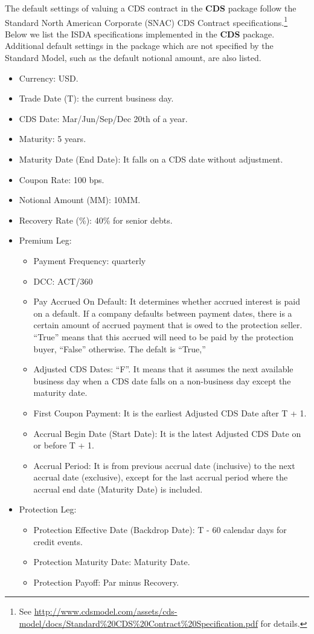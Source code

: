 \documentclass[a4paper]{article}
\begin{document}
The default settings of valuing a CDS contract in the \textbf{CDS}
package follow the Standard North American Corporate (SNAC) CDS
Contract specifications.\footnote{See
  \url{http://www.cdsmodel.com/assets/cds-model/docs/Standard\%20CDS\%20Contract\%20Specification.pdf}
  for details.} Below we list the ISDA specifications implemented in
the \textbf{CDS} package. Additional default settings in the package
which are not specified by the Standard Model, such as the default
notional amount, are also listed.


\begin{itemize}
\item Currency: USD.
\item Trade Date (T): the current business day.
\item CDS Date: Mar/Jun/Sep/Dec 20th of a year.
\item Maturity: 5 years.
\item Maturity Date (End Date): It falls on a CDS date without
  adjustment.
\item Coupon Rate: 100 bps.
\item Notional Amount (MM): 10MM.
\item Recovery Rate (\%): 40\% for senior debts.
\item Premium Leg:
  \begin{itemize}
    \item Payment Frequency: quarterly
    \item DCC: ACT/360
    \item Pay Accrued On Default: It determines whether accrued
      interest is paid on a default. If a company defaults between
      payment dates, there is a certain amount of accrued payment that
      is owed to the protection seller. ``True'' means that this
      accrued will need to be paid by the protection buyer, ``False''
      otherwise. The defalt is ``True,''
    \item Adjusted CDS Dates: ``F''. It means that it assumes the next
      available business day when a CDS date falls on a non-business day
      except the maturity date.
    \item First Coupon Payment: It is the earliest Adjusted CDS Date
      after T + 1.
    \item Accrual Begin Date (Start Date): It is the latest Adjusted
      CDS Date on or before T + 1.
    \item Accrual Period: It is from previous accrual date (inclusive)
      to the next accrual date (exclusive), except for the last
      accrual period where the accrual end date (Maturity Date) is
      included.
  \end{itemize}
\item Protection Leg:
  \begin{itemize}
  \item Protection Effective Date (Backdrop Date): T - 60 calendar
    days for credit events.
  \item Protection Maturity Date: Maturity Date.
  \item Protection Payoff: Par minus Recovery.
  \end{itemize}
\end{itemize}
\end{document}
